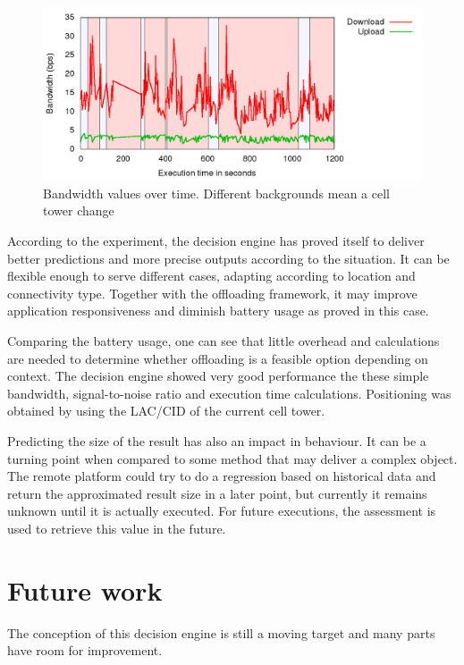 \documentclass[10pt, conference, letterpaper]{IEEEtran}
\begin{document}
\begin{figure}[!b]
  \centering
  \includegraphics[width=1\textwidth]{results/plots/bw-fluctuation/executions.png}
  \caption{Bandwidth values over time. Different backgrounds mean a cell tower change}
  \label{fig:bwtower}
\end{figure}


  According to the experiment, the decision engine has proved itself to deliver better predictions and more precise outputs according to the situation. It can be flexible enough to serve different cases, adapting according to location and connectivity type. Together with the offloading framework, it may improve application responsiveness and diminish battery usage as proved in this case.
  
  Comparing the battery usage, one can see that little overhead and calculations are needed to determine whether offloading is a feasible option depending on context. The decision engine showed very good performance the these simple bandwidth, signal-to-noise ratio and execution time calculations. Positioning was obtained by using the LAC/CID of the current cell tower.

  Predicting the size of the result has also an impact in behaviour. It can be a turning point when compared to some method that may deliver a complex object. The remote platform could try to do a regression based on historical data and return the approximated result size in a later point, but currently it remains unknown until it is actually executed. For future executions, the assessment is used to retrieve this value in the future.

  \section{Future work} \label{sec:futurework}

  The conception of this decision engine is still a moving target and many parts have room for improvement.
\end{document}

